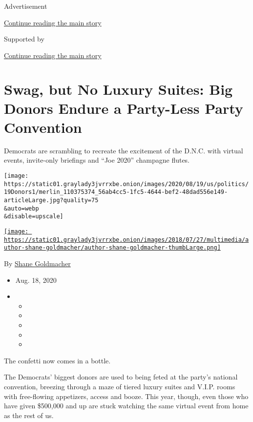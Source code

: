 Advertisement

\protect\hyperlink{after-top}{Continue reading the main story}

Supported by

\protect\hyperlink{after-sponsor}{Continue reading the main story}

\hypertarget{swag-but-no-luxury-suites-big-donors-endure-a-party-less-party-convention}{%
\section{Swag, but No Luxury Suites: Big Donors Endure a Party-Less
Party
Convention}\label{swag-but-no-luxury-suites-big-donors-endure-a-party-less-party-convention}}

Democrats are scrambling to recreate the excitement of the D.N.C. with
virtual events, invite-only briefings and ``Joe 2020'' champagne flutes.

\texttt{[image: https://static01.graylady3jvrrxbe.onion/images/2020/08/19/us/politics/19Donors1/merlin\_110375374\_56ab4cc5-1fc5-4644-bef2-48dad556e149-articleLarge.jpg?quality=75\\\&auto=webp\\\&disable=upscale]}

\href{https://www.nytimes3xbfgragh.onion/by/shane-goldmacher}{\texttt{[image: https://static01.graylady3jvrrxbe.onion/images/2018/07/27/multimedia/author-shane-goldmacher/author-shane-goldmacher-thumbLarge.png]}}

By \href{https://www.nytimes3xbfgragh.onion/by/shane-goldmacher}{Shane
Goldmacher}

\begin{itemize}
\item
  Aug. 18, 2020
\item
  \begin{itemize}
  \item
  \item
  \item
  \item
  \item
  \end{itemize}
\end{itemize}

The confetti now comes in a bottle.

The Democrats' biggest donors are used to being feted at the party's
national convention, breezing through a maze of tiered luxury suites and
V.I.P. rooms with free-flowing appetizers, access and booze. This year,
though, even those who have given \$500,000 and up are stuck watching
the same virtual event from home as the rest of us.


